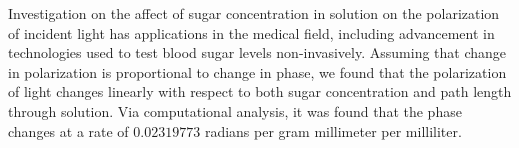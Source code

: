 Investigation on the affect of sugar concentration in solution on the polarization of incident light has applications in the medical field, including advancement in technologies used to test blood sugar levels non-invasively. Assuming that change in polarization is proportional to change in phase, we found that the polarization of light changes linearly with respect to both sugar concentration and path length through solution. Via computational analysis, it was found that the phase changes at a rate of $0.02319773$ radians per gram millimeter per milliliter. 